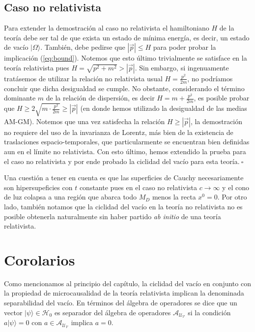 \subsection{Caso no relativista}
Para extender la demostración al caso no relativista el hamiltoniano $H$ de la teoría debe ser tal de que exista un estado de mínima energía, es decir, un estado de vacío $|\Omega\rangle$. También, debe pedirse que $|\vec{p}|\leq H$ para poder probar la implicación (\ref{eq:bound}). Notemos que esto último trivialmente se satisface en la teoría relativista pues $H=\sqrt{p^2+m^2}>|\vec{p}|$. Sin embargo, si ingenuamente tratásemos de utilizar la relación no relativista usual $H=\frac{p^2}{2m}$, no podríamos concluir que dicha desigualdad se cumple. No obstante, considerando el término dominante $m$ de la relación de dispersión, es decir $H=m+\frac{p^2}{2m}$, es posible probar que $H\geq 2\sqrt{m\cdot \frac{p^2}{2m}}\geq |\vec{p}|$ (en donde hemos utilizado la desigualdad de las medias AM-GM). Notemos que una vez satisfecha la relación $H\geq |\vec{p}|$, la demostración no requiere del uso de la invarianza de Lorentz, más bien de la existencia de traslaciones espacio-temporales, que particularmente se encuentran bien definidas aun en el límite no relativista. Con esto último, hemos extendido la prueba para el caso no relativista y por ende probado la ciclidad del vacío para esta teoría.$\: \square$

Una cuestión a tener en cuenta es que las superficies de Cauchy necesariamente son hipersupeficies con $t$ constante pues en el caso no relativista $c\rightarrow \infty$ y el cono de luz colapsa a una región que abarca todo $M_D$ menos la recta $x^0=0$. Por otro lado, también notamos que la ciclidad del vacío en la teoría no relativista no es posible obtenerla naturalmente sin haber partido \textit{ab initio} de una teoría relativista.


\section{Corolarios}
Como mencionamos al principio del capítulo, la ciclidad del vacío en conjunto con la propiedad de microcausalidad de la teoría relativista implican la denominada separabilidad del vacío. En términos del álgebra de operadores se dice que un vector $|\psi\rangle \in \mathcal{H}_0$ es separador del álgebra de operadores $\mathcal{A}_{\mathcal{U}_{\mathcal{V}}}$ si la condición $a|\psi\rangle=0$ con $a\in \mathcal{A}_{\mathcal{U}_{\mathcal{V}}}$ implica $a=0$.\\

